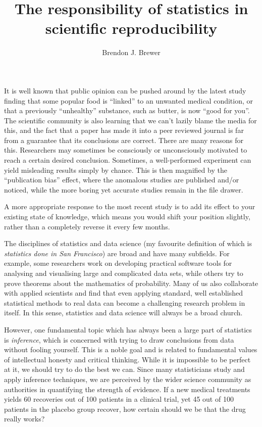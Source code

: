 \documentclass[a4paper, 11pt]{article}
\title{The responsibility of statistics in scientific reproducibility}
\author{Brendon J. Brewer}
\begin{document}
\maketitle

It is well known that public opinion can be pushed around by the latest study
finding that some popular food is ``linked'' to an unwanted medical condition,
or that a previously ``unhealthy'' substance, such as butter, is now
``good for you''. The scientific community is also learning that we can't lazily blame the media for this, and the fact that a paper has made it into a peer
reviewed journal is far from a guarantee that its conclusions are correct.
There are many reasons for this. Researchers may sometimes be consciously or
unconsciously motivated to reach a certain desired conclusion.
Sometimes, a well-performed experiment can yield
misleading results simply by chance. This is then magnified by the
``publication bias'' effect, where the anomalous studies are published
and/or noticed, while the more boring yet accurate studies remain in the
file drawer.

A more appropriate response to the most recent study is
to add its effect to your existing state of knowledge,
which means you would shift your position slightly,
rather than a completely reverse it every few months.


The disciplines of statistics and data science
(my favourite definition of which is {\it statistics done in San Francisco})
are broad and have many subfields. For example, some researchers
work on developing practical software tools for analysing and visualising large and
complicated data sets, while others try to prove theorems about the mathematics
of probability. Many of us also collaborate with applied scientists and find
that even applying standard, well established statistical methods to
real data can become a challenging research problem in itself. In this sense,
statistics and data science will always be a broad church.

However, one fundamental topic which has always been a large part of
statistics is {\it inference}, which is concerned with trying to
draw conclusions from data without fooling yourself. This is a noble goal
and is related to fundamental values of intellectual honesty and critical
thinking. While
it is impossible to be perfect at it, we should try to do the best
we can. Since many statisticians study and apply inference techniques,
we are perceived by the wider science community as authorities
in quantifying the strength of evidence. If a new medical treatments yields 60
recoveries out of 100 patients in a clinical trial, yet 45 out of 100 patients
in the placebo group recover, how certain should we be that the drug really works?
\end{document}
